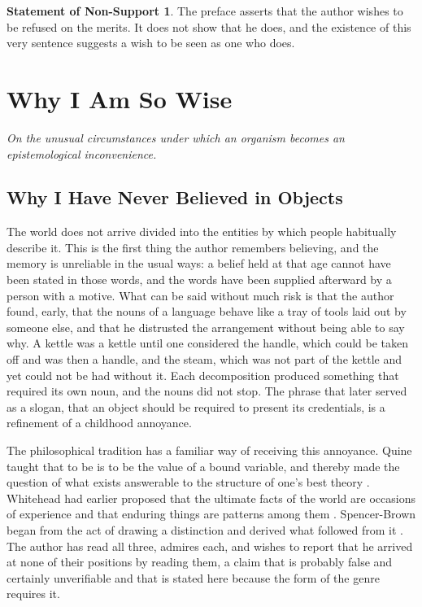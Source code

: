 \documentclass[11pt,openany,twoside]{book}
\theoremstyle{plain}
\theoremstyle{definition}
\newtheorem{nonsupport}{Statement of Non-Support}
\theoremstyle{remark}
\begin{document}
\begin{nonsupport}
The preface asserts that the author wishes to be refused on the merits. It does not show that he does, and the existence of this very sentence suggests a wish to be seen as one who does.
\end{nonsupport}

\part{Why I Am So Wise}

\begin{center}\emph{On the unusual circumstances under which an organism becomes an epistemological inconvenience.}\end{center}

\chapter{Why I Have Never Believed in Objects}

The world does not arrive divided into the entities by which people habitually describe it. This is the first thing the author remembers believing, and the memory is unreliable in the usual ways: a belief held at that age cannot have been stated in those words, and the words have been supplied afterward by a person with a motive. What can be said without much risk is that the author found, early, that the nouns of a language behave like a tray of tools laid out by someone else, and that he distrusted the arrangement without being able to say why. A kettle was a kettle until one considered the handle, which could be taken off and was then a handle, and the steam, which was not part of the kettle and yet could not be had without it. Each decomposition produced something that required its own noun, and the nouns did not stop. The phrase that later served as a slogan, that an object should be required to present its credentials, is a refinement of a childhood annoyance.

The philosophical tradition has a familiar way of receiving this annoyance. Quine taught that to be is to be the value of a bound variable, and thereby made the question of what exists answerable to the structure of one's best theory \cite{quine-onwhat}. Whitehead had earlier proposed that the ultimate facts of the world are occasions of experience and that enduring things are patterns among them \cite{whitehead-process}. Spencer-Brown began from the act of drawing a distinction and derived what followed from it \cite{spencerbrown-laws}. The author has read all three, admires each, and wishes to report that he arrived at none of their positions by reading them, a claim that is probably false and certainly unverifiable and that is stated here because the form of the genre requires it.
\end{document}
